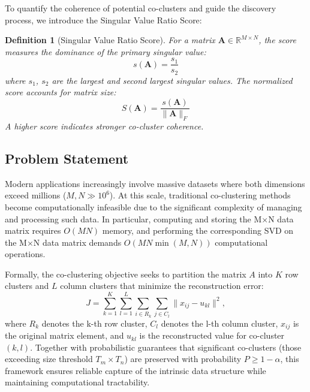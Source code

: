 \documentclass[journal]{IEEEtran}
\newtheorem{definition}{Definition}
\begin{document}
To quantify the coherence of potential co-clusters and guide the discovery process, we introduce the Singular Value Ratio Score:

\begin{definition}[Singular Value Ratio Score]
    For a matrix $\mathbf{A} \in \mathbb{R}^{M \times N}$, the score measures the dominance of the primary singular value:
    \begin{equation}
        s(\mathbf{A}) = \frac{s_1}{s_2}
    \end{equation}
    where $s_1$, $s_2$ are the largest and second largest singular values. The normalized score accounts for matrix size:
    \begin{equation}
        S(\mathbf{A}) = \frac{s(\mathbf{A})}{\|\mathbf{A}\|_F}
    \end{equation}
    A higher score indicates stronger co-cluster coherence.
\end{definition}

\subsection{Problem Statement}
\label{subsec:problem-statement}
Modern applications increasingly involve massive datasets where both dimensions exceed millions ($M, N \gg 10^6$). At this scale, traditional co-clustering methods become computationally infeasible due to the significant complexity of managing and processing such data. {\color{blue}In particular, computing and storing the M×N data matrix requires $O(MN)$ memory, and performing the corresponding SVD on the M×N data matrix demands $O(MN\min(M,N))$ computational operations.}

    {\color{blue}Formally, the co-clustering objective seeks to partition the matrix $A$ into $K$ row clusters and $L$ column clusters that minimize the reconstruction error:
        \begin{equation}
            J = \sum_{k=1}^{K} \sum_{l=1}^{L} \sum_{i \in R_k} \sum_{j \in C_l} \| x_{ij} - u_{kl} \|^2,
        \end{equation}
        where $R_k$ denotes the k-th row cluster, $C_l$ denotes the l-th column cluster, $x_{ij}$ is the original matrix element, and $u_{kl}$ is the reconstructed value for co-cluster $(k,l)$. Together with probabilistic guarantees that significant co-clusters (those exceeding size threshold $T_m \times T_n$) are preserved with probability $P \geq 1 - \alpha$, this framework ensures reliable capture of the intrinsic data structure while maintaining computational tractability.}
\end{document}
